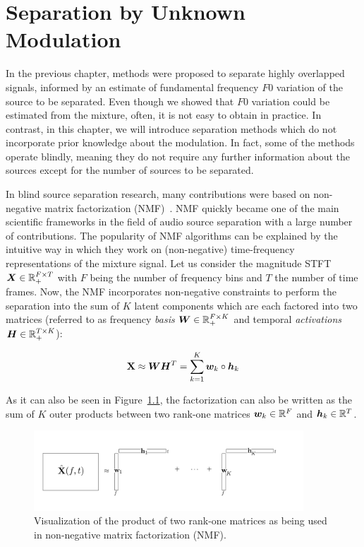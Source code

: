 \chapter{Separation by Unknown Modulation}
\label{cha:unknown}

In the previous chapter, methods were proposed to separate highly overlapped signals, informed by an estimate of fundamental frequency \(F0\) variation of the source to be separated.
Even though we showed that \(F0\)  variation could be estimated from the mixture, often, it is not easy to obtain in practice.
In contrast, in this chapter, we will introduce separation methods which do not incorporate prior knowledge about the modulation. 
In fact, some of the methods operate blindly, meaning they do not require any further information about the sources except for the number of sources to be separated.
\par
In blind source separation research, many contributions were based on non-negative matrix factorization (NMF)~\cite{lee99, lee01}.
NMF quickly became one of the main scientific frameworks in the field of audio source separation with a large number of contributions.
The popularity of NMF algorithms can be explained by the intuitive way in which they work on (non-negative) time-frequency representations of the mixture signal.
Let us consider the magnitude STFT \({\bm{X}} \in {\mathbb{R}}_{+}^{F \times T}\) with \(F\) being the number of frequency bins and \(T\) the number of time frames.
Now, the NMF incorporates non-negative constraints to perform the separation into the sum of \(K\) latent components which are each factored into two matrices (referred to as frequency \emph{basis} \({\bm{W}} \in {\mathbb{R}}_{+}^ { F \times K }\) and temporal \emph{activations} \({\bm{H}} \in {\mathbb{R}}_{+}^ { T \times K }\)):

\begin{equation}
   \mathbf{X} \approx {\bm{W}} {\bm{H}}^{T} = \sum\limits_{k=1}^{K} {\bm{w}}_{k} \circ {\bm{h}}_{k}
   \label{eq:vanilla_nmf}
\end{equation}

As it can also be seen in Figure~\ref{fig:nmf}, the factorization can also be
written as the sum of \(K\) outer products between two rank-one matrices \({\bm{w}}_k \in {\mathbb{R}}^F\)
and \({\bm{h}}_k \in {\mathbb{R}}^T\).

\begin{figure}[ht]
  \centering
  \includegraphics[width=0.9\textwidth]{Chapters/06_Separation_Unknown/figures/nmf.pdf}
  \caption{Visualization of the product of two rank-one matrices as being used in non-negative matrix factorization (NMF).}
  \label{fig:nmf}
\end{figure}

